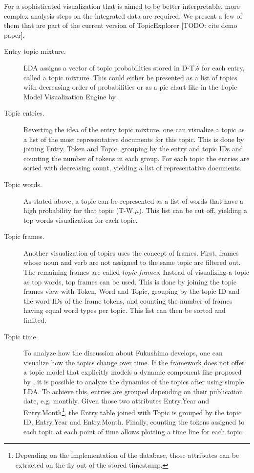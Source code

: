 For a sophisticated visualization that is aimed to be better interpretable, more complex analysis steps on the integrated data are required. We present a few of them that are part of the current version of TopicExplorer [TODO: cite demo paper].

\begin{description}
\item[Entry topic mixture.] LDA assigns a vector of topic probabilities stored in D-T.$\theta$ for each entry, called a topic mixture. This could either be presented as a list of topics with decreasing order of probabilities or as a pie chart like in the Topic Model Visualization Engine by \textcite{chaney2012visualizing}.

\item[Topic entries.] Reverting the idea of the entry topic mixture, one can visualize a topic as a list of the most representative documents for this topic. This is done by joining Entry, Token and Topic, grouping by the entry and topic IDs and counting the number of tokens in each group. For each topic the entries are sorted with decreasing count, yielding a list of representative documents.

\item[Topic words.] As stated above, a topic can be represented as a list of words that have a high probability for that topic (T-W.$\mu$). This list can be cut off, yielding a top words visualization for each topic.

\item[Topic frames.] Another visualization of topics uses the concept of frames. First, frames whose noun and verb are not assigned to the same topic are filtered out. The remaining frames are called \emph{topic frames}. Instead of visualizing a topic as top words, top frames can be used. This is done by joining the topic frames view with Token, Word and Topic, grouping by the topic ID and the word IDs of the frame tokens, and counting the number of frames having equal word types per topic. This list can then be sorted and limited.

\item[Topic time.] To analyze how the discussion about Fukushima develops, one can visualize how the topics change over time. If the framework does not offer a topic model that explicitly models a dynamic component like proposed by \textcite{blei2006dynamic}, it is possible to analyze the dynamics of the topics after using simple LDA. To achieve this, entries are grouped depending on their publication date, e.g. monthly. Given those two attributes Entry.Year and Entry.Month\footnote{Depending on the implementation of the database, those attributes can be extracted on the fly out of the stored timestamp.}, the Entry table joined with Topic is grouped by the topic ID, Entry.Year and Entry.Month. Finally, counting the tokens assigned to each topic at each point of time allows plotting a time line for each topic.
\end{description}

